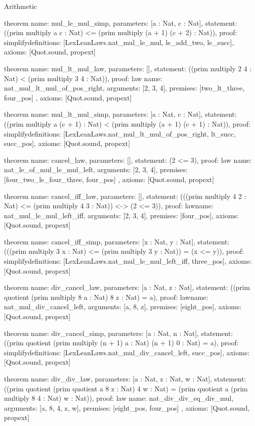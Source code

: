 \begin{lexlean}{Arithmetic}
\begin{semanticmodule}
theorem{
  name: mul_le_mul_simp,
  parameters: [a : Nat, c : Nat],
  statement: ((prim multiply a c : Nat) <= (prim multiply (a + 1) (c + 2) : Nat)),
  proof: simplify{definitions: [LexLeanLaws.nat_mul_le_mul, le_add_two, le_succ]},
  axioms: [Quot.sound, propext]
}

theorem{
  name: mul_lt_mul_law,
  parameters: [],
  statement: ((prim multiply 2 4 : Nat) < (prim multiply 3 4 : Nat)),
  proof: law{
    name: nat_mul_lt_mul_of_pos_right,
    arguments: [2, 3, 4],
    premises: [two_lt_three, four_pos]
  },
  axioms: [Quot.sound, propext]
}

theorem{
  name: mul_lt_mul_simp,
  parameters: [a : Nat, c : Nat],
  statement: ((prim multiply a (c + 1) : Nat) < (prim multiply (a + 1) (c + 1) : Nat)),
  proof: simplify{definitions: [LexLeanLaws.nat_mul_lt_mul_of_pos_right, lt_succ, succ_pos]},
  axioms: [Quot.sound, propext]
}

theorem{
  name: cancel_law,
  parameters: [],
  statement: (2 <= 3),
  proof: law{
    name: nat_le_of_mul_le_mul_left,
    arguments: [2, 3, 4],
    premises: [four_two_le_four_three, four_pos]
  },
  axioms: [Quot.sound, propext]
}

theorem{
  name: cancel_iff_law,
  parameters: [],
  statement: (((prim multiply 4 2 : Nat) <= (prim multiply 4 3 : Nat)) <-> (2 <= 3)),
  proof: law{name: nat_mul_le_mul_left_iff, arguments: [2, 3, 4], premises: [four_pos]},
  axioms: [Quot.sound, propext]
}

theorem{
  name: cancel_iff_simp,
  parameters: [x : Nat, y : Nat],
  statement: (((prim multiply 3 x : Nat) <= (prim multiply 3 y : Nat)) = (x <= y)),
  proof: simplify{definitions: [LexLeanLaws.nat_mul_le_mul_left_iff, three_pos]},
  axioms: [Quot.sound, propext]
}

theorem{
  name: div_cancel_law,
  parameters: [a : Nat, z : Nat],
  statement: ((prim quotient (prim multiply 8 a : Nat) 8 z : Nat) = a),
  proof: law{name: nat_mul_div_cancel_left, arguments: [a, 8, z], premises: [eight_pos]},
  axioms: [Quot.sound, propext]
}

theorem{
  name: div_cancel_simp,
  parameters: [a : Nat, n : Nat],
  statement: ((prim quotient (prim multiply (n + 1) a : Nat) (n + 1) 0 : Nat) = a),
  proof: simplify{definitions: [LexLeanLaws.nat_mul_div_cancel_left, succ_pos]},
  axioms: [Quot.sound, propext]
}

theorem{
  name: div_div_law,
  parameters: [a : Nat, z : Nat, w : Nat],
  statement: ((prim quotient (prim quotient a 8 z : Nat) 4 w : Nat) = (prim quotient a (prim multiply 8 4 : Nat) w : Nat)),
  proof: law{
    name: nat_div_div_eq_div_mul,
    arguments: [a, 8, 4, z, w],
    premises: [eight_pos, four_pos]
  },
  axioms: [Quot.sound, propext]
}


\end{semanticmodule}
\end{lexlean}
